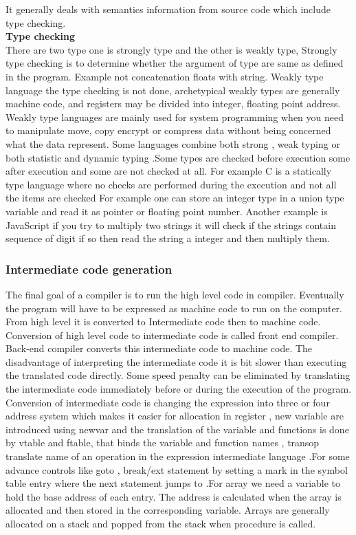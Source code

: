 \documentclass[23pt]{article}
\begin{document}
{\Large It generally deals with semantics information from source code which include type checking. \\
\textbf{Type checking} \\
There are two type one is strongly type and the other is weakly type, Strongly type checking is to determine whether the argument of type are same as defined in the program. Example not concatenation floats with string. Weakly type language the type checking is not done, archetypical weakly types are generally machine code, and registers may be divided into integer, floating point address. Weakly type languages are mainly used for system programming when you need to manipulate move, copy encrypt or compress data without being concerned what the data represent. Some languages combine both strong , weak typing or both statistic and dynamic typing .Some types are checked before execution some after execution and some are not checked at all. For example C is a statically type language where no checks are performed during the execution and not all the items are checked
For example one can store an integer type in a union type variable and read it as pointer or floating point number. Another example is JavaScript if you try to multiply two strings it will check if the strings contain sequence of digit if so then read the string a integer and then multiply them.\\ \par}

\subsubsection{Intermediate code generation} 
{\Large The final goal of a compiler is to run the high level code in compiler. Eventually the program will have to be expressed as machine code to run on the computer. From high level it is converted to 
Intermediate code then to machine code. Conversion of high level code to intermediate code is called front end compiler. Back-end compiler converts this intermediate code to machine code.
The disadvantage of interpreting the intermediate code it is bit slower than executing the translated code directly. Some speed penalty can be eliminated by translating the intermediate code immediately before or during the execution of the program. Conversion of intermediate  code is changing the expression into three or four address system which makes it easier for allocation in register , new variable are introduced using newvar and the translation of the variable and functions is done by vtable and ftable, that binds the variable and function names , transop translate name of an operation in the expression intermediate language .For some advance controls like goto , break/ext statement by setting a mark in the symbol table  entry where the next statement jumps to .For array we need a variable to hold the base address of each entry. The address is calculated when the array is allocated and then stored in the corresponding variable. Arrays are generally allocated on a stack and popped from the stack when procedure is called. \par}
\end{document}
